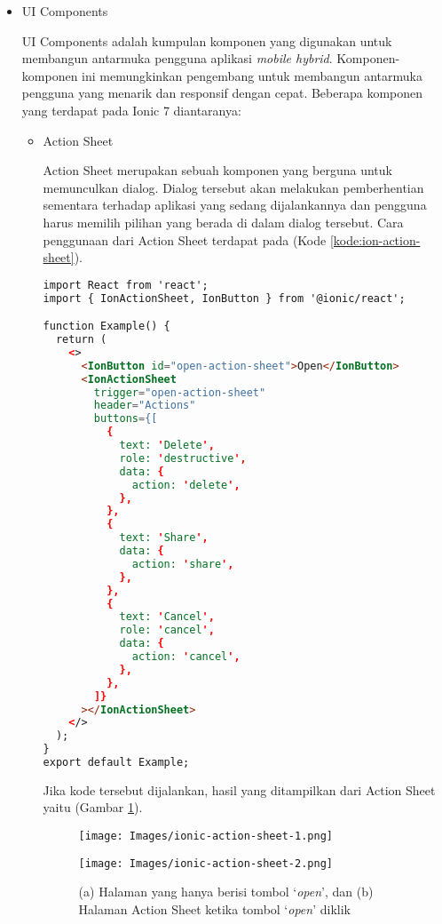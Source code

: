 \documentclass[a4paper,twoside]{article}
\begin{document}
\begin{enumerate}
\begin{itemize}
    \item UI Components

    UI Components adalah kumpulan komponen yang digunakan untuk membangun antarmuka pengguna aplikasi \textit{mobile hybrid}. Komponen-komponen ini memungkinkan pengembang untuk membangun antarmuka pengguna yang menarik dan responsif dengan cepat. Beberapa komponen yang terdapat pada Ionic 7 diantaranya:

    \begin{itemize}
        \item Action Sheet

        Action Sheet merupakan sebuah komponen yang berguna untuk memunculkan dialog. Dialog tersebut akan melakukan pemberhentian sementara terhadap aplikasi yang sedang dijalankannya dan pengguna harus memilih pilihan yang berada di dalam dialog tersebut. Cara penggunaan dari Action Sheet terdapat pada (Kode \ref{kode:ion-action-sheet}).

\begin{lstlisting}[language=HTML, caption=Contoh Potongan Kode Action Sheet, label=kode:ion-action-sheet]
import React from 'react';
import { IonActionSheet, IonButton } from '@ionic/react';

function Example() {
  return (
    <>
      <IonButton id="open-action-sheet">Open</IonButton>
      <IonActionSheet
        trigger="open-action-sheet"
        header="Actions"
        buttons={[
          {
            text: 'Delete',
            role: 'destructive',
            data: {
              action: 'delete',
            },
          },
          {
            text: 'Share',
            data: {
              action: 'share',
            },
          },
          {
            text: 'Cancel',
            role: 'cancel',
            data: {
              action: 'cancel',
            },
          },
        ]}
      ></IonActionSheet>
    </>
  );
}
export default Example;
\end{lstlisting}

Jika kode tersebut dijalankan, hasil yang ditampilkan dari Action Sheet yaitu (Gambar \ref{fig:action-sheet-example}).

\begin{figure}[H]
    \centering
    \begin{minipage}{0.25\linewidth}
        \texttt{[image: Images/ionic-action-sheet-1.png]}
        \subcaption{}
    \end{minipage}
    \begin{minipage}{0.25\linewidth}
        \texttt{[image: Images/ionic-action-sheet-2.png]}
        \subcaption{}
    \end{minipage}
    \caption[Gambar Hasil Action Sheet]{(a) Halaman yang hanya berisi tombol `\textit{open}', dan (b) Halaman Action Sheet ketika tombol `\textit{open}' diklik}
    \label{fig:action-sheet-example}
\end{figure}


\end{itemize}
\end{itemize}
\end{enumerate}
\end{document}
